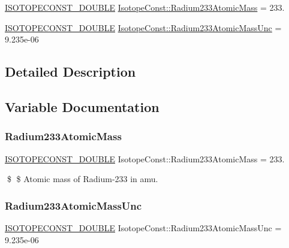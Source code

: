 \begin{DoxyCompactItemize}
\item 
\mbox{\hyperlink{group___isotope_const-_macros_ga8f45a7272ce02c0b4c65c44636ed719a}{I\+S\+O\+T\+O\+P\+E\+C\+O\+N\+S\+T\+\_\+\+D\+O\+U\+B\+LE}} \mbox{\hyperlink{group___isotope_const-_radium-_ra233_ga548c5081e08b057f3ce9b8a6bec5ca4c}{Isotope\+Const\+::\+Radium233\+Atomic\+Mass}} = 233.
\item 
\mbox{\hyperlink{group___isotope_const-_macros_ga8f45a7272ce02c0b4c65c44636ed719a}{I\+S\+O\+T\+O\+P\+E\+C\+O\+N\+S\+T\+\_\+\+D\+O\+U\+B\+LE}} \mbox{\hyperlink{group___isotope_const-_radium-_ra233_ga73b9c525649eeb82019d6073f9e7defd}{Isotope\+Const\+::\+Radium233\+Atomic\+Mass\+Unc}} = 9.\+235e-\/06
\end{DoxyCompactItemize}


\subsection{Detailed Description}


\subsection{Variable Documentation}
\mbox{\label{group___isotope_const-_radium-_ra233_ga548c5081e08b057f3ce9b8a6bec5ca4c}} 
\subsubsection{\texorpdfstring{Radium233\+Atomic\+Mass}{Radium233AtomicMass}}
{\footnotesize\ttfamily \mbox{\hyperlink{group___isotope_const-_macros_ga8f45a7272ce02c0b4c65c44636ed719a}{I\+S\+O\+T\+O\+P\+E\+C\+O\+N\+S\+T\+\_\+\+D\+O\+U\+B\+LE}} Isotope\+Const\+::\+Radium233\+Atomic\+Mass = 233.}

\$ \$ Atomic mass of Radium-\/233 in amu. \mbox{\label{group___isotope_const-_radium-_ra233_ga73b9c525649eeb82019d6073f9e7defd}} 
\subsubsection{\texorpdfstring{Radium233\+Atomic\+Mass\+Unc}{Radium233AtomicMassUnc}}
{\footnotesize\ttfamily \mbox{\hyperlink{group___isotope_const-_macros_ga8f45a7272ce02c0b4c65c44636ed719a}{I\+S\+O\+T\+O\+P\+E\+C\+O\+N\+S\+T\+\_\+\+D\+O\+U\+B\+LE}} Isotope\+Const\+::\+Radium233\+Atomic\+Mass\+Unc = 9.\+235e-\/06}


